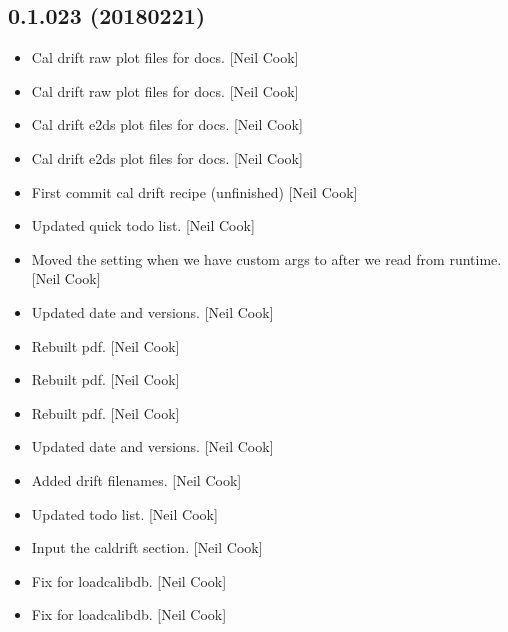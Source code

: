 \documentclass[a4paper,10pt,english]{report}
\begin{document}
\subsection{0.1.023 (2018\sphinxhyphen{}02\sphinxhyphen{}21)}
\label{\detokenize{misc/changelog:id499}}\begin{itemize}
\item {} 
Cal drift raw plot files for docs. {[}Neil Cook{]}

\item {} 
Cal drift raw plot files for docs. {[}Neil Cook{]}

\item {} 
Cal drift e2ds plot files for docs. {[}Neil Cook{]}

\item {} 
Cal drift e2ds plot files for docs. {[}Neil Cook{]}

\item {} 
First commit \sphinxhyphen{} cal drift recipe (unfinished) {[}Neil Cook{]}

\item {} 
Updated quick todo list. {[}Neil Cook{]}

\item {} 
Moved the  setting when we have custom args
to after we read from runtime. {[}Neil Cook{]}

\item {} 
Updated date and versions. {[}Neil Cook{]}

\item {} 
Rebuilt pdf. {[}Neil Cook{]}

\item {} 
Rebuilt pdf. {[}Neil Cook{]}

\item {} 
Rebuilt pdf. {[}Neil Cook{]}

\item {} 
Updated date and versions. {[}Neil Cook{]}

\item {} 
Added drift filenames. {[}Neil Cook{]}

\item {} 
Updated todo list. {[}Neil Cook{]}

\item {} 
Input the caldrift section. {[}Neil Cook{]}

\item {} 
Fix for loadcalibdb. {[}Neil Cook{]}

\item {} 
Fix for loadcalibdb. {[}Neil Cook{]}

\end{itemize}
\end{document}
